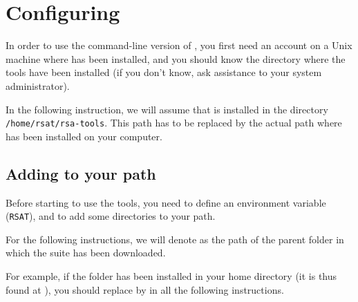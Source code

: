 \section{Configuring \RSAT}


In order to use the command-line version of \RSAT, you first need an
account on a Unix machine where \RSAT has been installed, and you
should know the directory where the tools have been installed (if you
don't know, ask assistance to your system administrator).

In the following instruction, we will assume that \RSAT is installed
in the directory \texttt{/home/rsat/rsa-tools}. This path has to be
replaced by the actual path where \RSAT has been installed on your
computer.

\subsection{Adding \RSAT  to your path}

Before starting to use the tools, you need to define an environment
variable (\texttt{RSAT}), and to add some directories to your path.

For the following instructions, we will denote as 
the path of the parent folder in which the \RSAT suite has been
downloaded.

For example, if the  folder has been installed in your
home directory (it is thus found at ), you
should replace  by  in all the
following instructions. 


